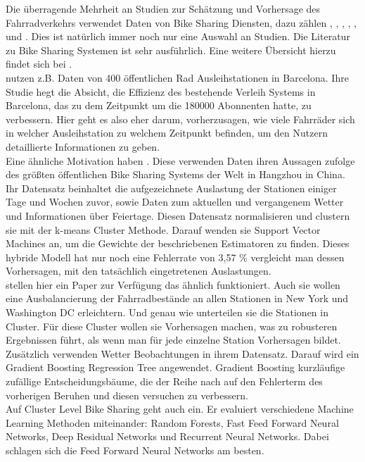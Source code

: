 \documentclass[a4paper,12pt]{thesis}
\begin{document}
Die überragende Mehrheit an Studien zur Schätzung und Vorhersage des Fahrradverkehrs verwendet Daten von Bike Sharing Diensten, dazu zählen \cite{Kaltenbrunner2010}, \cite{Xu2013}, \cite{Li2015}, \cite{Mitchell2018PredictingBT}, \cite{Colace2020}, \cite{Gao2022} und \cite{Li2022}. Dies ist natürlich immer noch nur eine Auswahl an Studien. Die Literatur zu Bike Sharing Systemen ist sehr ausführlich. Eine weitere Übersicht hierzu findet sich bei \cite{Mitchell2018PredictingBT}.\\
\cite{Kaltenbrunner2010} nutzen z.B. Daten von 400 öffentlichen Rad Ausleihstationen in Barcelona. Ihre Studie hegt die Absicht, die Effizienz des bestehende Verleih Systems in Barcelona, das zu dem Zeitpunkt um die 180000 Abonnenten hatte, zu verbessern. Hier geht es also eher darum, vorherzusagen, wie viele Fahrräder sich in welcher Ausleihstation zu welchem Zeitpunkt befinden, um den Nutzern detaillierte Informationen zu geben.\\
Eine ähnliche Motivation haben \cite{Xu2013}. Diese verwenden Daten ihren Aussagen zufolge des größten öffentlichen Bike Sharing Systems der Welt in Hangzhou in China. Ihr Datensatz beinhaltet die aufgezeichnete Auslastung der Stationen einiger Tage und Wochen zuvor, sowie Daten zum aktuellen und vergangenem Wetter und Informationen über Feiertage. Diesen Datensatz normalisieren und clustern sie mit der k-means Cluster Methode. Darauf wenden sie Support Vector Machines an, um die Gewichte der beschriebenen Estimatoren zu finden. Dieses hybride Modell hat nur noch eine Fehlerrate von 3,57 \% vergleicht man dessen Vorhersagen, mit den tatsächlich eingetretenen Auslastungen.\\
\cite{Li2015} stellen hier ein Paper zur Verfügung das ähnlich funktioniert. Auch sie wollen eine Ausbalancierung der Fahrradbestände an allen Stationen in New York und Washington DC erleichtern. Und genau wie \cite{Xu2013} unterteilen sie die Stationen in Cluster. Für diese Cluster wollen sie Vorhersagen machen, was zu robusteren Ergebnissen führt, als wenn man für jede einzelne Station Vorhersagen bildet. Zusätzlich verwenden \cite{Li2015} Wetter Beobachtungen in ihrem Datensatz. Darauf wird ein Gradient Boosting Regression Tree angewendet. Gradient Boosting kurzläufige zufällige Entscheidungsbäume, die der Reihe nach auf den Fehlerterm des vorherigen Beruhen und diesen versuchen zu verbessern.\\
Auf Cluster Level Bike Sharing geht auch \cite{Mitchell2018PredictingBT} ein. Er evaluiert verschiedene Machine Learning Methoden miteinander: Random Forests, Fast Feed Forward Neural Networks, Deep Residual Networks und Recurrent Neural Networks.  Dabei schlagen sich die Feed Forward Neural Networks am besten.\\
\end{document}
